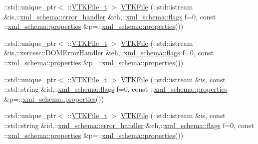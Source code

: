 \begin{DoxyCompactItemize}
\item 
\+::std\+::unique\+\_\+ptr$<$ \+::\hyperlink{classVTKFile__t}{V\+T\+K\+File\+\_\+t} $>$ \hyperlink{vtk-unstructured_8h_a84eeb68dc218a3b15ec8bca0db550bb9}{V\+T\+K\+File} (\+::std\+::istream \&is,\+::\hyperlink{namespacexml__schema_a0a5d9528e9175cedf199984a8bb64d62}{xml\+\_\+schema\+::error\+\_\+handler} \&eh,\+::\hyperlink{namespacexml__schema_a0612287d030cb2732d31a45b258fdc87}{xml\+\_\+schema\+::flags} f=0, const \+::\hyperlink{namespacexml__schema_a1a8ebac679580b41baebd62c7d641c1d}{xml\+\_\+schema\+::properties} \&p=\+::\hyperlink{namespacexml__schema_a1a8ebac679580b41baebd62c7d641c1d}{xml\+\_\+schema\+::properties}())
\item 
\+::std\+::unique\+\_\+ptr$<$ \+::\hyperlink{classVTKFile__t}{V\+T\+K\+File\+\_\+t} $>$ \hyperlink{vtk-unstructured_8h_a035eba24cc87b1642d959f6900c77032}{V\+T\+K\+File} (\+::std\+::istream \&is,\+::xercesc\+::\+D\+O\+M\+Error\+Handler \&eh,\+::\hyperlink{namespacexml__schema_a0612287d030cb2732d31a45b258fdc87}{xml\+\_\+schema\+::flags} f=0, const \+::\hyperlink{namespacexml__schema_a1a8ebac679580b41baebd62c7d641c1d}{xml\+\_\+schema\+::properties} \&p=\+::\hyperlink{namespacexml__schema_a1a8ebac679580b41baebd62c7d641c1d}{xml\+\_\+schema\+::properties}())
\item 
\+::std\+::unique\+\_\+ptr$<$ \+::\hyperlink{classVTKFile__t}{V\+T\+K\+File\+\_\+t} $>$ \hyperlink{vtk-unstructured_8h_affbf65f8af109b8ab1f78b91efbb3ed2}{V\+T\+K\+File} (\+::std\+::istream \&is, const \+::std\+::string \&id,\+::\hyperlink{namespacexml__schema_a0612287d030cb2732d31a45b258fdc87}{xml\+\_\+schema\+::flags} f=0, const \+::\hyperlink{namespacexml__schema_a1a8ebac679580b41baebd62c7d641c1d}{xml\+\_\+schema\+::properties} \&p=\+::\hyperlink{namespacexml__schema_a1a8ebac679580b41baebd62c7d641c1d}{xml\+\_\+schema\+::properties}())
\item 
\+::std\+::unique\+\_\+ptr$<$ \+::\hyperlink{classVTKFile__t}{V\+T\+K\+File\+\_\+t} $>$ \hyperlink{vtk-unstructured_8h_aa510453c1584633a523642d5b87ae014}{V\+T\+K\+File} (\+::std\+::istream \&is, const \+::std\+::string \&id,\+::\hyperlink{namespacexml__schema_a0a5d9528e9175cedf199984a8bb64d62}{xml\+\_\+schema\+::error\+\_\+handler} \&eh,\+::\hyperlink{namespacexml__schema_a0612287d030cb2732d31a45b258fdc87}{xml\+\_\+schema\+::flags} f=0, const \+::\hyperlink{namespacexml__schema_a1a8ebac679580b41baebd62c7d641c1d}{xml\+\_\+schema\+::properties} \&p=\+::\hyperlink{namespacexml__schema_a1a8ebac679580b41baebd62c7d641c1d}{xml\+\_\+schema\+::properties}())
\item 

\end{DoxyCompactItemize}
